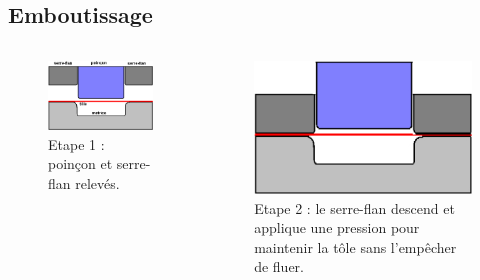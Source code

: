 \documentclass{beamer}
\begin{document}
\subsection{Emboutissage}
\begin{frame}
    \begin{columns}
        \begin{figure}
            \includegraphics[width=\textwidth]{img/Emboutissage1.jpg}
            \caption{Etape 1 : poinçon et serre-flan relevés.}
        \end{figure}
        \begin{figure}
            \includegraphics[width=\textwidth]{img/Emboutissage2.jpg}
            \caption{Etape 2 : le serre-flan descend et applique une pression pour maintenir la tôle sans l'empêcher de fluer.}
        \end{figure}
    \end{columns}
\end{frame}
\end{document}
